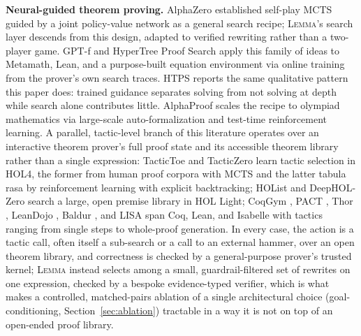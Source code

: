 \documentclass[11pt]{article}
\numberwithin{equation}{section}
\newcommand{\lemma}{\textsc{Lemma}}
\begin{document}
\textbf{Neural-guided theorem proving.} AlphaZero \citep{silver2018alphazero} established self-play MCTS guided by a joint policy-value network as a general search recipe; \lemma{}'s search layer descends from this design, adapted to verified rewriting rather than a two-player game. GPT-f \citep{polu2020gptf} and HyperTree Proof Search \citep{lample2022htps} apply this family of ideas to Metamath, Lean, and a purpose-built equation environment via online training from the prover's own search traces. HTPS reports the same qualitative pattern this paper does: trained guidance separates solving from not solving at depth while search alone contributes little. AlphaProof \citep{hubert2025alphaproof} scales the recipe to olympiad mathematics via large-scale auto-formalization and test-time reinforcement learning. A parallel, tactic-level branch of this literature operates over an interactive theorem prover's full proof state and its accessible theorem library rather than a single expression: TacticToe \citep{gauthier2021tactictoe} and TacticZero \citep{wu2021tacticzero} learn tactic selection in HOL4, the former from human proof corpora with MCTS and the latter tabula rasa by reinforcement learning with explicit backtracking; HOList and DeepHOL-Zero \citep{bansal2019holist,bansal2019deephol} search a large, open premise library in HOL Light; CoqGym \citep{yang2019coqgym}, PACT \citep{han2021pact}, Thor \citep{jiang2022thor}, LeanDojo \citep{yang2023leandojo}, Baldur \citep{first2023baldur}, and LISA \citep{jiang2021lisa} span Coq, Lean, and Isabelle with tactics ranging from single steps to whole-proof generation. In every case, the action is a tactic call, often itself a sub-search or a call to an external hammer, over an open theorem library, and correctness is checked by a general-purpose prover's trusted kernel; \lemma{} instead selects among a small, guardrail-filtered set of rewrites on one expression, checked by a bespoke evidence-typed verifier, which is what makes a controlled, matched-pairs ablation of a single architectural choice (goal-conditioning, Section~\ref{sec:ablation}) tractable in a way it is not on top of an open-ended proof library.
\end{document}
